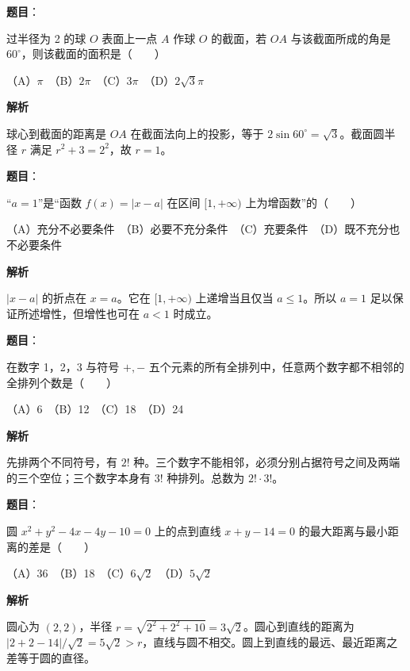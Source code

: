 \begin{answer}

\textbf{题目}：

过半径为 2 的球 $O$ 表面上一点 $A$ 作球 $O$ 的截面，若 $OA$ 与该截面所成的角是 $60^\circ$，则该截面的面积是\mbox{（　　）}

（A）$\pi$　（B）$2\pi$　（C）$3\pi$　（D）$2\sqrt3\pi$

\textbf{解析}

球心到截面的距离是 $OA$ 在截面法向上的投影，等于 $2\sin60^\circ=\sqrt3$。截面圆半径 $r$ 满足 $r^2+3=2^2$，故 $r=1$。


\end{answer}
\begin{answer}

\textbf{题目}：

“$a=1$”是“函数 $f(x)=|x-a|$ 在区间 $[1,+\infty)$ 上为增函数”的\mbox{（　　）}

（A）充分不必要条件　（B）必要不充分条件　（C）充要条件　（D）既不充分也不必要条件

\textbf{解析}

$|x-a|$ 的折点在 $x=a$。它在 $[1,+\infty)$ 上递增当且仅当 $a\leqslant1$。所以 $a=1$ 足以保证所述增性，但增性也可在 $a<1$ 时成立。


\end{answer}
\begin{answer}

\textbf{题目}：

在数字 1，2，3 与符号 $+,-$ 五个元素的所有全排列中，任意两个数字都不相邻的全排列个数是\mbox{（　　）}

（A）6　（B）12　（C）18　（D）24

\textbf{解析}

先排两个不同符号，有 $2!$ 种。三个数字不能相邻，必须分别占据符号之间及两端的三个空位；三个数字本身有 $3!$ 种排列。总数为 $2!\cdot3!$。


\end{answer}
\begin{answer}

\textbf{题目}：

圆 $x^2+y^2-4x-4y-10=0$ 上的点到直线 $x+y-14=0$ 的最大距离与最小距离的差是\mbox{（　　）}

（A）36　（B）18　（C）$6\sqrt2$　（D）$5\sqrt2$

\textbf{解析}

圆心为 $(2,2)$，半径 $r=\sqrt{2^2+2^2+10}=3\sqrt2$。圆心到直线的距离为 $|2+2-14|/\sqrt2=5\sqrt2>r$，直线与圆不相交。圆上到直线的最远、最近距离之差等于圆的直径。


\end{answer}
